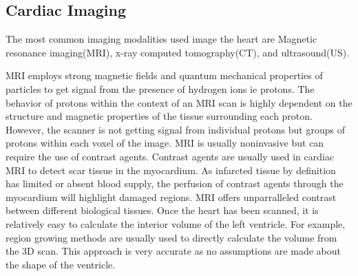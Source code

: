 \documentclass{article}
\begin{document}
\subsection{Cardiac Imaging}

The most common imaging modalities used image the heart are Magnetic resonance imaging(MRI), x-ray computed tomography(CT), and ultrasound(US).

MRI employs strong magnetic fields and quantum mechanical properties of particles to get signal from the presence of hydrogen ions ie protons.
The behavior of protons within the context of an MRI scan is highly dependent on the structure and magnetic properties of the tissue surrounding each proton.
However, the scanner is not getting signal from individual protons but groups of protons within each voxel of the image.
MRI is usually noninvasive but can require the use of contrast agents.
Contrast agents are usually used in cardiac MRI to detect scar tissue in the myocardium.
As infarcted tissue by definition has limited or absent blood supply, the perfusion of contrast agents through the myocardium will highlight damaged regions.
MRI offers unparralleled contrast between different biological tissues.
Once the heart has been scanned, it is relatively easy to calculate the interior volume of the left ventricle.
For example, region growing methods are usually used  to directly calculate the volume from the 3D scan.
This approach is very accurate as no assumptions are made about the shape of the ventricle.
\end{document}
